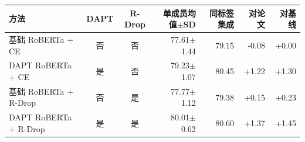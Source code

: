 \begin{tabular}{lccrrrr}
\toprule
方法 & DAPT & R-Drop & 单成员均值$\pm$SD & 同标签集成 & 对论文 & 对基线\\
\midrule
基础 RoBERTa + CE & 否 & 否 & 77.61$\pm$1.44 & 79.15 & -0.08 & +0.00\\
DAPT RoBERTa + CE & 是 & 否 & 79.23$\pm$1.07 & 80.45 & +1.22 & +1.30\\
基础 RoBERTa + R-Drop & 否 & 是 & 77.77$\pm$1.12 & 79.38 & +0.15 & +0.23\\
\rowcolor{LightGreen}DAPT RoBERTa + R-Drop & 是 & 是 & 80.01$\pm$0.62 & 80.60 & +1.37 & +1.45\\
\bottomrule
\end{tabular}
